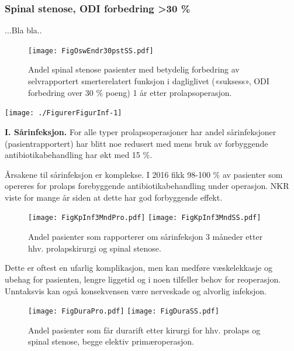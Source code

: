 \documentclass [norsk,a4paper,twoside]{article}\usepackage[]{graphicx}\usepackage[]{color}
\newenvironment{knitrout}{}{} %
\begin{document}
\subsubsection{Spinal stenose, ODI forbedring >30 \%}

...Bla bla..

\begin{figure}[ht]
\centering \texttt{[image: FigOswEndr30pstSS.pdf]}
\caption{\label{fig:OswEndr30pstSS} Andel spinal stenose pasienter med betydelig forbedring av selvrapportert
smerterelatert funksjon i dagliglivet («suksess», ODI forbedring over 30 \% poeng) 1 år
etter prolapsoperasjon.}
\end{figure}


\begin{knitrout}
\color{fgcolor}

{\centering \texttt{[image: ./FigurerFigurInf-1]} 

}



\end{knitrout}

\textbf{I. Sårinfeksjon.}
For alle typer prolapsoperasjoner har
andel sårinfeksjoner (pasientrapportert) har blitt noe redusert med mens
bruk av forbyggende antibiotikabehandling har økt med 15 \%. 

Årsakene til sårinfeksjon er komplekse. I 2016 fikk 98-100 \% av pasienter som
opereres for prolaps forebyggende antibiotikabehandling under operasjon. NKR
viste for mange år siden at dette har god forbyggende effekt.

\begin{figure}[ht]
\centering \texttt{[image: FigKpInf3MndPro.pdf]}
\centering \texttt{[image: FigKpInf3MndSS.pdf]}
\caption{\label{fig:KpInf} Andel pasienter som rapporterer om sårinfeksjon 3 måneder etter
hhv. prolapskirurgi og spinal stenose.}
\end{figure}



Dette er oftest en ufarlig komplikasjon, men kan medføre væskelekkasje og
ubehag for pasienten, lengre liggetid og i noen tilfeller behov for reoperasjon.
Unntaksvis kan også konsekvensen være nerveskade og alvorlig infeksjon.
\begin{figure}[ht]
\centering \texttt{[image: FigDuraPro.pdf]}
\centering \texttt{[image: FigDuraSS.pdf]}
\caption{\label{fig:Dura} Andel pasienter som får durarift etter kirurgi for hhv. prolaps og spinal stenose, begge elektiv primæroperasjon.}
\end{figure}
\end{document}

